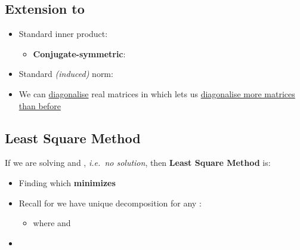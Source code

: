 \subsection*{\texorpdfstring{Extension to
            }{Extension to }}

\begin{itemize}

      \item
            Standard inner product:

            \begin{itemize}

                  \item
                        \textbf{Conjugate-symmetric}:
            \end{itemize}
      \item
            Standard \emph{(induced)} norm:
      \item
            We can \underline{diagonalise} real matrices in
             which lets us \underline{diagonalise more matrices than before}
\end{itemize}

\subsection*{Least Square Method}


If we are solving  and
, \emph{i.e.~no solution},
then \textbf{Least Square Method} is:

\begin{itemize}

      \item
            Finding  which \textbf{minimizes}
      \item
            Recall for  we have unique decomposition for
            any :

            \begin{itemize}

                  \item
                        where  and
            \end{itemize}
      \item
\end{itemize}

